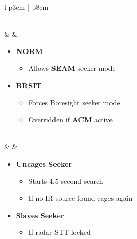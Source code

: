 \documentclass[8pt,usenames,dvipsnames,twoside]{article}
\begin{document}
\begin{center}
\begin{longtable}{l p{3cm} | p{8cm}}
\begin{minipage}[t]{\linewidth}
\begin{itemize}
\begin{itemize}
						\end{itemize}
					\end{itemize}
				\end{minipage} \\
				\midrule
				\textbullet &   & 
				\begin{minipage}[t]{\linewidth}
					\vspace{-7pt}
					\begin{itemize}
						\item \textbf{NORM}
						\begin{itemize}
							\item Allows \textbf{SEAM} seeker mode
						\end{itemize}
						\item \textbf{BRSIT}
						\begin{itemize}
							\item Forces Boresight seeker mode
							\item Overridden if \textbf{ACM} active
						\end{itemize}
					\end{itemize}
				\end{minipage} \\
				\midrule
				\textbullet &   \hfill\null {} & 
				\begin{minipage}[t]{\linewidth}
					\vspace{-7pt}
					\begin{itemize}
						\item \textbf{Uncages Seeker}
						\begin{itemize}
							\item Starts 4.5 second search
							\item If no IR source found cages again
						\end{itemize}
						\item \textbf{Slaves Seeker}
						\begin{itemize}
							\item If radar STT locked
						\end{itemize}
					\end{itemize}
				\end{minipage} \\
				\bottomrule
			\end{longtable}
		\end{center}
	
\end{document}
